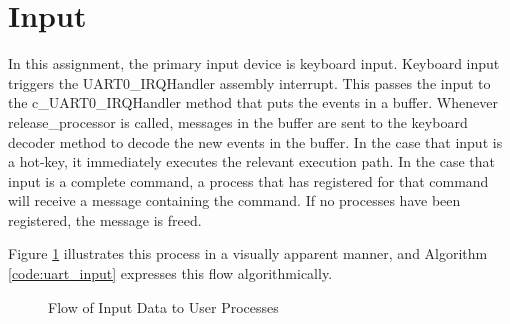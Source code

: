 \documentclass[12pt]{report}
\begin{document}
\section{Input}
\label{sec:Input}
    In this assignment, the primary input device is keyboard input.
    Keyboard input triggers the UART0\_IRQHandler assembly interrupt. This
    passes the input to the c\_UART0\_IRQHandler method that puts the events
    in a buffer. Whenever release\_processor is called, messages in the
    buffer are sent to the keyboard decoder method to decode the new
    events in the buffer. In the case that input is a hot-key,
    it immediately executes the relevant execution path. In the case that input
    is a complete command, a process that has registered for that command will
    receive a message containing the command. If no processes have been
    registered, the message is freed.

    Figure \ref{figure:inputDiagram} illustrates this process in a visually
    apparent manner, and Algorithm \ref{code:uart_input} expresses this flow
    algorithmically.

    \begin{figure}
        \centering
        \label{figure:inputDiagram}
        \caption{Flow of Input Data to User Processes}
    \end{figure}
\end{document}
